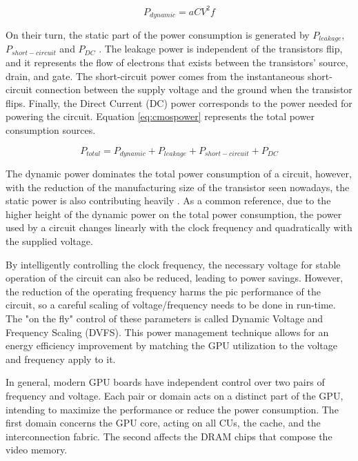 \begin{equation}
    P_{dynamic} = aCV^2f
    \label{eq:dynpower}
\end{equation}


On their turn, the static part of the power consumption is generated by $P_{leakage}$, $P_{short-circuit}$ and $P_{DC}$ \cite{mei_survey_2016}. The leakage power is independent of the transistors flip, and it represents the flow of electrons that exists between the transistors' source, drain, and gate. The short-circuit power comes from the instantaneous short-circuit connection between the supply voltage and the ground when the transistor flips. Finally, the Direct Current (DC) power corresponds to the power needed for powering the circuit. Equation \ref{eq:cmospower} represents the total power consumption sources.

\begin{equation}
    P_{total} = P_{dynamic} + P_{leakage} + P_{short-circuit} + P_{DC}
    \label{eq:cmospower}
\end{equation}

The dynamic power dominates the total power consumption of a circuit, however, with the reduction of the manufacturing size of the transistor seen nowadays, the static power is also contributing heavily \cite{s._hong_modeling_2012} \cite{hong_integrated_2010}. As a common reference, due to the higher height of the dynamic power on the total power consumption, the power used by a circuit changes linearly with the clock frequency and quadratically with the supplied voltage.


By intelligently controlling the clock frequency, the necessary voltage for stable operation of the circuit can also be reduced, leading to power savings. However, the reduction of the operating frequency harms the pic performance of the circuit, so a careful scaling of voltage/frequency needs to be done in run-time. The "on the fly" control of these parameters is called Dynamic Voltage and Frequency Scaling (DVFS). This power management technique allows for an energy efficiency improvement by matching the GPU utilization to the voltage and frequency apply to it.

In general, modern GPU boards have independent control over two pairs of frequency and voltage. Each pair or domain acts on a distinct part of the GPU, intending to maximize the performance or reduce the power consumption. The first domain concerns the GPU core, acting on all CUs, the cache, and the interconnection fabric. The second affects the DRAM chips that compose the video memory. 

